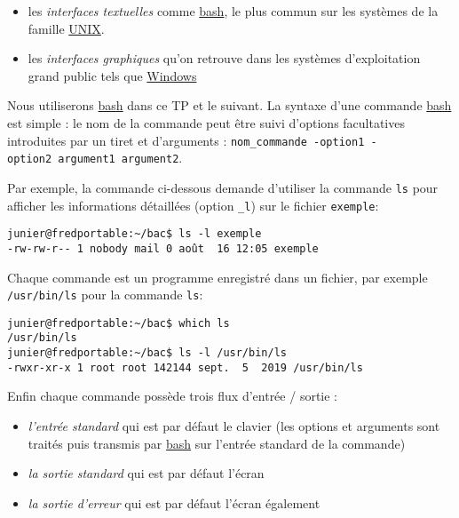 \documentclass[
  11pt,
]{article}
\providecommand{\tightlist}{%
  \setlength{\itemsep}{0pt}\setlength{\parskip}{0pt}}
\newcounter{prog}
\begin{document}
\begin{itemize}
\tightlist
\item
  les \emph{interfaces textuelles} comme
  \href{https://fr.wikipedia.org/wiki/Bourne-Again_shell}{bash}, le plus
  commun sur les systèmes de la famille
  \href{https://fr.wikipedia.org/wiki/Bourne-Again_shell}{UNIX}.
\item
  les \emph{interfaces graphiques} qu'on retrouve dans les systèmes
  d'exploitation grand public tels que
  \href{https://fr.wikipedia.org/wiki/Microsoft_Windows}{Windows}
\end{itemize}

Nous utiliserons
\href{https://fr.wikipedia.org/wiki/Bourne-Again_shell}{bash} dans ce TP
et le suivant. La syntaxe d'une commande
\href{https://fr.wikipedia.org/wiki/Bourne-Again_shell}{bash} est simple
: le nom de la commande peut être suivi d'options facultatives
introduites par un tiret et d'arguments :
\texttt{nom\_commande\ -option1\ -option2\ argument1\ argument2}.

Par exemple, la commande ci-dessous demande d'utiliser la commande
\texttt{ls} pour afficher les informations détaillées (option
\texttt{\_l}) sur le fichier \texttt{exemple}:

\begin{verbatim}
junier@fredportable:~/bac$ ls -l exemple
-rw-rw-r-- 1 nobody mail 0 août  16 12:05 exemple
\end{verbatim}

Chaque commande est un programme enregistré dans un fichier, par exemple
\texttt{/usr/bin/ls} pour la commande \texttt{ls}:

\begin{verbatim}
junier@fredportable:~/bac$ which ls
/usr/bin/ls
junier@fredportable:~/bac$ ls -l /usr/bin/ls
-rwxr-xr-x 1 root root 142144 sept.  5  2019 /usr/bin/ls
\end{verbatim}

Enfin chaque commande possède trois flux d'entrée / sortie :

\begin{itemize}
\tightlist
\item
  \emph{l'entrée standard} qui est par défaut le clavier (les options et
  arguments sont traités puis transmis par
  \href{https://fr.wikipedia.org/wiki/Bourne-Again_shell}{bash} sur
  l'entrée standard de la commande)
\item
  \emph{la sortie standard} qui est par défaut l'écran
\item
  \emph{la sortie d'erreur} qui est par défaut l'écran également
\end{itemize}
\end{document}
